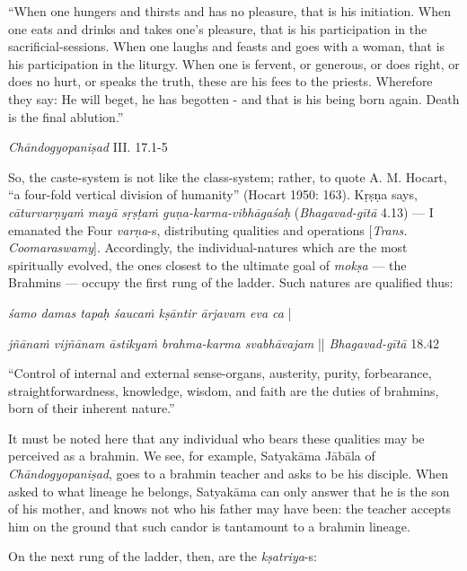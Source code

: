 \begin{myquote}
“When one hungers and thirsts and has no pleasure, that is his initiation. When one eats and drinks and takes one’s pleasure, that is his participation in the sacrificial-sessions. When one laughs and feasts and goes with a woman, that is his participation in the liturgy. When one is fervent, or generous, or does right, or does no hurt, or speaks the truth, these are his fees to the priests. Wherefore they say: He will beget, he has begotten - and that is his being born again. Death is the final ablution.” 

{\sl Chāndogyopaniṣad} III. 17.1-5  
\end{myquote}

So, the caste-system is not like the class-system; rather, to quote A. M. Hocart, “a four-fold vertical division of humanity” (Hocart 1950: 163). Kṛṣṇa says, {\sl cāturvarṇyaṁ mayā sṛṣṭaṁ guṇa-karma-vibhāgaśaḥ} ({\sl Bhagavad-gītā} 4.13) --- I emanated the Four {\sl varṇa}-s, distributing qualities and operations [{\sl Trans. Coomaraswamy}]. Accordingly, the individual-natures which are the most spiritually evolved, the ones closest to the ultimate goal of {\sl mokṣa} --- the Brahmins --- occupy the first rung of the ladder. Such natures are qualified thus:

\begin{myquote}
{{\sl śamo damas tapaḥ śaucaṁ kṣāntir ārjavam eva ca}} |

{\sl jñānaṁ vijñānam āstikyaṁ brahma-karma svabhāvajam} || {\sl Bhagavad-gītā} 18.42
\end{myquote}

\begin{myquote}
“Control of internal and external sense-organs, austerity, purity, forbearance, straightforwardness, knowledge, wisdom, and faith are the duties of brahmins, born of their inherent nature.”
\end{myquote}

It must be noted here that any individual who bears these qualities may be perceived as a brahmin. We see, for example, Satyakāma Jābāla of {\sl Chāndogyopaniṣad}, goes to a brahmin teacher and asks to be his disciple. When asked to what lineage he belongs, Satyakāma can only answer that he is the son of his mother, and knows not who his father may have been: the teacher accepts him on the ground that such candor is tantamount to a brahmin lineage. 

On the next rung of the ladder, then, are the {\sl kṣatriya}-s:

